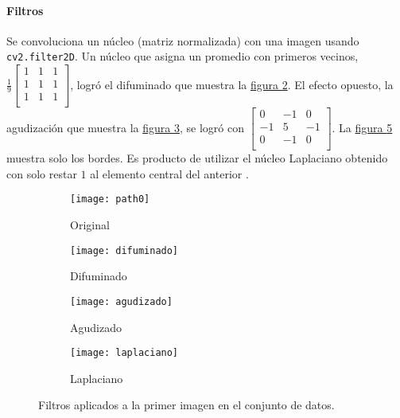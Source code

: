 \documentclass{article}
\begin{document}
\paragraph{Filtros} 
Se convoluciona un núcleo (matriz normalizada) con una imagen usando \verb'cv2.filter2D'.
Un núcleo que asigna un promedio con primeros vecinos, \(
\frac{1}{9} \left[ {\begin{array}{ccc}
	1 & 1 & 1 \\
	1 & 1 & 1 \\
	1 & 1 & 1 \\
\end{array} } \right]
\), logró el difuminado que muestra la \hyperref[fg:difuminado]{figura \ref*{fg:difuminado}}.
El efecto opuesto, la agudización que muestra la \hyperref[fg:agudizado]{figura \ref*{fg:agudizado}}, se logró con \(
\left[ {\begin{array}{ccc}
	0 & -1 & 0 \\
	-1 & 5 & -1 \\
	0 & -1 & 0 \\
\end{array} } \right].
\)
La \hyperref[fg:laplaciano]{figura \ref*{fg:laplaciano}} muestra solo los bordes.
Es producto de utilizar el núcleo Laplaciano obtenido con solo restar $1$ al elemento central del anterior \cite{noauthor_opencv_nodate-1}.

\begin{figure}
	\centering
	\begin{subfigure}[b]{0.24\textwidth}
		\texttt{[image: path0]}
		\caption{Original}
		\label{fg:original}
	\end{subfigure}
	\begin{subfigure}[b]{0.24\textwidth}
		\texttt{[image: difuminado]}
		\caption{Difuminado}
		\label{fg:difuminado}
	\end{subfigure}
	\begin{subfigure}[b]{0.24\textwidth}
		\texttt{[image: agudizado]}
		\caption{Agudizado}
		\label{fg:agudizado}
	\end{subfigure}
	\begin{subfigure}[b]{0.24\textwidth}
		\texttt{[image: laplaciano]}
		\caption{Laplaciano}
		\label{fg:laplaciano}
	\end{subfigure}
	\caption{Filtros aplicados a la primer imagen en el conjunto de datos.}
\end{figure}



\end{document}
